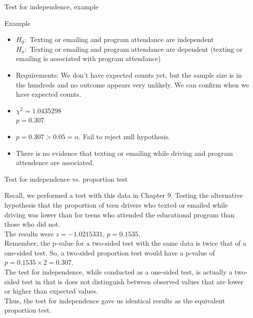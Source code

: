 \documentclass[xcolor=table, handout]{beamer}
\begin{document}
\begin{frame}{Test for independence, example}
\begin{exampleblock}{Example}
\begin{itemize}
\pause\item $H_0:$ Texting or emailing and program attendance are independent\\
$H_a:$ Texting or emailing and program attendance are dependent (texting or emailing is associated with program attendance)
\pause\item Requirements: We don't have expected counts yet, but the sample size is in the hundreds and no outcome appears very unlikely. We can confirm when we have expected counts.
\pause\item $\chi^2 = 1.0435298$\\
$p = 0.307 $
\pause\item $p = 0.307 > 0.05 = \alpha$. Fail to reject null hypothesis.
\pause\item There is no evidence that texting or emailing while driving and program attendence are associated.
\end{itemize}
\end{exampleblock}
\end{frame}

\begin{frame}{Test for independence vs. proportion test}
\begin{block}{}
Recall, we performed a test with this data in Chapter 9. Testing the alternative hypothesis that the proportion of teen drivers who texted or emailed while driving was lower than for teens who attended the educational program than those who did not. \\
\pause\medskip 
The results were $z = -1.0215331, \, p = 0.1535$.\\
\pause\medskip
Remember, the p-value for a two-sided test with the same data is twice that of a one-sided test. So, a two-sided proportion test would have a p-value of $p = 0.1535 \times 2 = 0.307$.\\
\pause\medskip
The test for independence, while conducted as a one-sided test, is actually a two-sided test in that is does not distinguish between observed values that are lower or higher than expected values.\\
\pause\medskip
Thus, the test for independence gave us identical results as the equivalent proportion test.
\end{block}
\end{frame}
\end{document}
